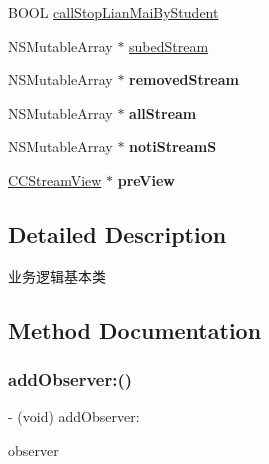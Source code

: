 \begin{DoxyCompactItemize}
B\+O\+OL \hyperlink{interface_c_c_streamer_basic_aa682504571afd589ebd01253fa47f016}{call\+Stop\+Lian\+Mai\+By\+Student}
\item 
N\+S\+Mutable\+Array $\ast$ \hyperlink{interface_c_c_streamer_basic_aa37da66cdd8a8790bfafd4b7bd5cac1d}{subed\+Stream}
\item 
\mbox{\label{interface_c_c_streamer_basic_ade20cd09c942d8d757f36a58f5bbeafb}} 
N\+S\+Mutable\+Array $\ast$ {\bfseries removed\+Stream}
\item 
\mbox{\label{interface_c_c_streamer_basic_a91b72ad1cc66d4d95b74e76e93a7f4e9}} 
N\+S\+Mutable\+Array $\ast$ {\bfseries all\+Stream}
\item 
\mbox{\label{interface_c_c_streamer_basic_a1475f3c49106369cdb5f0c505afd5dcd}} 
N\+S\+Mutable\+Array $\ast$ {\bfseries noti\+StreamS}
\item 
\mbox{\label{interface_c_c_streamer_basic_a8eff4e259f9398452ee12b58805905af}} 
\hyperlink{interface_c_c_stream_view}{C\+C\+Stream\+View} $\ast$ {\bfseries pre\+View}
\end{DoxyCompactItemize}


\subsection{Detailed Description}
业务逻辑基本类 

\subsection{Method Documentation}
\mbox{\label{interface_c_c_streamer_basic_ad25d3d5930be6f375133272c6ff30324}} 
\subsubsection{\texorpdfstring{add\+Observer\+:()}{addObserver:()}}
{\footnotesize\ttfamily -\/ (void) add\+Observer\+: \begin{DoxyParamCaption}\item[{(id$<$ C\+C\+Streamer\+Basic\+Delegate $>$)}]{observer }\end{DoxyParamCaption}}

